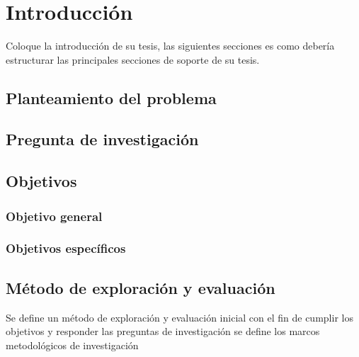 \chapter{Introducción}
\ifpdf
    \graphicspath{{Introduction/IntroductionFigs/PNG/}{Introduction/IntroductionFigs/PDF/}{Introduction/IntroductionFigs/}}
\else
    \graphicspath{{Introduction/IntroductionFigs/EPS/}{Introduction/IntroductionFigs/}}
\fi

Coloque la introducción de su tesis, las siguientes secciones es como debería estructurar las principales secciones de soporte de su tesis.

\section{Planteamiento del problema}

\section{Pregunta de investigación}

\section{Objetivos}

\subsection{Objetivo general}

\subsection{Objetivos específicos}

\section{Método de exploración y evaluación}

Se define un método de exploración y evaluación inicial con el fin de cumplir los objetivos y responder las preguntas de investigación se define los marcos metodológicos de investigación


